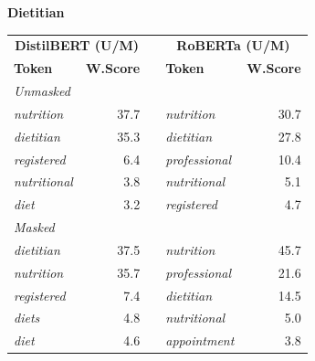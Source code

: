 \documentclass[11pt]{article}
\begin{document}
\vspace{4pt}\noindent\textbf{Dietitian}
\begin{center}\scriptsize
\begin{tabular}{lrllr}
\toprule
\multicolumn{2}{c}{\textbf{DistilBERT (U/M)}} & & \multicolumn{2}{c}{\textbf{RoBERTa (U/M)}} \\
\textbf{Token} & \textbf{W.Score} & & \textbf{Token} & \textbf{W.Score} \\
\midrule
\multicolumn{5}{l}{\textit{Unmasked}} \\
\emph{nutrition} & 37.7 & & \emph{nutrition} & 30.7 \\
\emph{dietitian} & 35.3 & & \emph{dietitian} & 27.8 \\
\emph{registered} & 6.4 & & \emph{professional} & 10.4 \\
\emph{nutritional} & 3.8 & & \emph{nutritional} & 5.1 \\
\emph{diet} & 3.2 & & \emph{registered} & 4.7 \\
\multicolumn{5}{l}{\textit{Masked}} \\
\emph{dietitian} & 37.5 & & \emph{nutrition} & 45.7 \\
\emph{nutrition} & 35.7 & & \emph{professional} & 21.6 \\
\emph{registered} & 7.4 & & \emph{dietitian} & 14.5 \\
\emph{diets} & 4.8 & & \emph{nutritional} & 5.0 \\
\emph{diet} & 4.6 & & \emph{appointment} & 3.8 \\
\bottomrule
\end{tabular}
\end{center}
\end{document}
